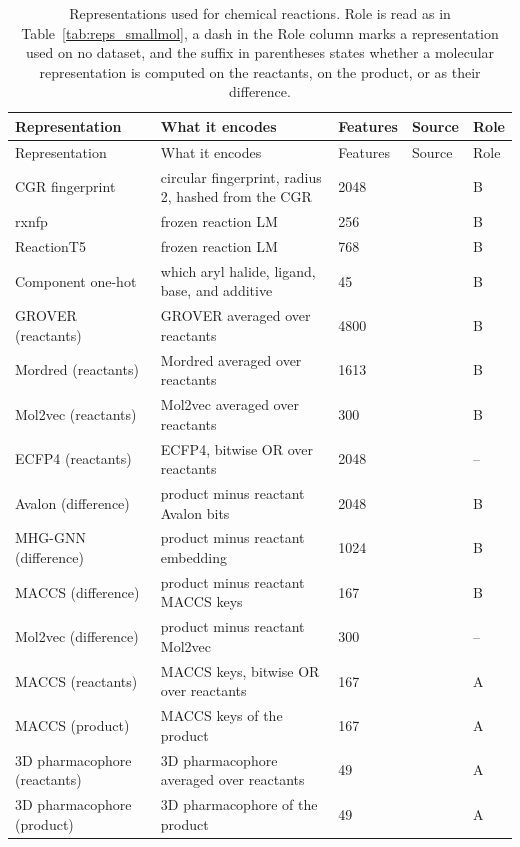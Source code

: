 {\footnotesize
\begin{longtable}{P{3.0cm}P{5.0cm}P{1.5cm}P{1.5cm}P{1.4cm}}
\caption[Representations used for chemical reactions.]{Representations used for chemical reactions. Role is read as in Table~\ref{tab:reps_smallmol}, a dash in the Role column marks a representation used on no dataset, and the suffix in parentheses states whether a molecular representation is computed on the reactants, on the product, or as their difference.}\label{tab:reps_reactions}\\
\toprule
Representation & What it encodes & Features & Source & Role \\
\midrule
\endfirsthead
\toprule
Representation & What it encodes & Features & Source & Role \\
\midrule
\endhead
\bottomrule
\endfoot
CGR fingerprint & circular fingerprint, radius 2, hashed from the CGR & 2048 & \citep{Varnek2005, Hoonakker2011} & B \\
rxnfp & frozen reaction LM & 256 & \citep{Schwaller2021rxnfp} & B \\
ReactionT5 & frozen reaction LM & 768 & \citep{Sagawa2023ReactionT5} & B \\
Component one-hot & which aryl halide, ligand, base, and additive & 45 & \citep{Ahneman2018} & B \\
GROVER (reactants) & GROVER averaged over reactants & 4800 & \citep{Rong2020GROVER} & B \\
Mordred (reactants) & Mordred averaged over reactants & 1613 & \citep{Moriwaki2018} & B \\
Mol2vec (reactants) & Mol2vec averaged over reactants & 300 & \citep{Jaeger2018} & B \\
ECFP4 (reactants) & ECFP4, bitwise OR over reactants & 2048 & \citep{rogers2010} & -- \\
Avalon (difference) & product minus reactant Avalon bits & 2048 & \citep{Gedeck2006} & B \\
MHG-GNN (difference) & product minus reactant embedding & 1024 & \citep{kishimoto2023} & B \\
MACCS (difference) & product minus reactant MACCS keys & 167 & \citep{Durant2002} & B \\
Mol2vec (difference) & product minus reactant Mol2vec & 300 & \citep{Jaeger2018} & -- \\
MACCS (reactants) & MACCS keys, bitwise OR over reactants & 167 & \citep{Durant2002} & A \\
MACCS (product) & MACCS keys of the product & 167 & \citep{Durant2002} & A \\
3D pharmacophore (reactants) & 3D pharmacophore averaged over reactants & 49 & \citep{rdkit} & A \\
3D pharmacophore (product) & 3D pharmacophore of the product & 49 & \citep{rdkit} & A \\
\end{longtable}}


